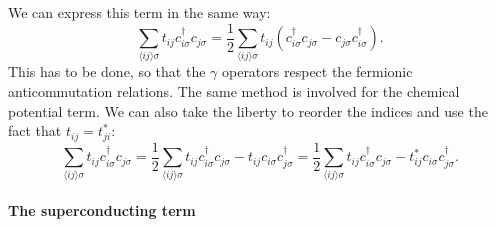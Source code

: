 \documentclass[../main.tex]{subfile}
\begin{document}
We can express this term in the same way:
\[
    \sum_{\langle ij\rangle\sigma} t_{ij} c_{i\sigma}^{\dagger} c_{j\sigma} = \frac{1}{2}\sum_{\langle ij\rangle \sigma} t_{ij} \left(c_{i\sigma}^{\dagger}c_{j\sigma} - c_{j\sigma}c_{i\sigma}^{\dagger}\right).
\]
This has to be done, so that the $\gamma$ operators respect the fermionic anticommutation relations. The same method is involved for the chemical potential term.
We can also take the liberty to reorder the indices and use the fact that $t_{ij} = t_{ji}^{\ast}$:
\begin{equation}\label{eq:SymHam_tij}
    \sum_{\langle ij\rangle\sigma} t_{ij} c_{i\sigma}^{\dagger} c_{j\sigma} = \frac{1}{2}\sum_{\langle ij\rangle \sigma} t_{ij}c_{i\sigma}^{\dagger}c_{j\sigma} - t_{ij}c_{i\sigma}c_{j\sigma}^{\dagger} = \frac{1}{2}\sum_{\langle ij\rangle \sigma} t_{ij}c_{i\sigma}^{\dagger}c_{j\sigma} - t_{ij}^{\ast}c_{i\sigma}c_{j\sigma}^{\dagger}.
\end{equation}
\paragraph{The superconducting term}$~$\\ 
\end{document}
